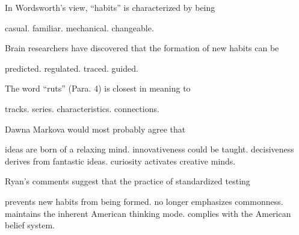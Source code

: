 \item In Wordsworth's view, ``habits'' is characterized by being
\begin{tasks}
	\task casual.
	\task familiar.
	\task mechanical.
	\task changeable.
\end{tasks}
\item Brain researchers have discovered that the formation of new habits can be
\begin{tasks}
	\task predicted.
	\task regulated.
	\task traced.
	\task guided.
\end{tasks}
\item The word ``ruts'' (Para. 4) is closest in meaning to
\begin{tasks}
	\task tracks.
	\task series.
	\task characteristics.
	\task connections.
\end{tasks}
\item Dawna Markova would most probably agree that
\begin{tasks}
	\task ideas are born of a relaxing mind.
	\task innovativeness could be taught.
	\task decisiveness derives from fantastic ideas.
	\task curiosity activates creative minds.
\end{tasks}
\item Ryan's comments suggest that the practice of standardized testing
\begin{tasks}
	\task prevents new habits from being formed.
	\task no longer emphasizes commonness.
	\task maintains the inherent American thinking mode.
	\task complies with the American belief system.
\end{tasks}